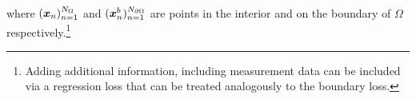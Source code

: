 where $({\bm{x}}_n)_{n=1}^{N_\Omega}$ and  $({\bm{x}}^b_n)_{n=1}^{N_{\partial\Omega}}$ are points in the interior and on the boundary of $\Omega$ respectively.\footnote{Adding additional information, including measurement data can be included via a regression loss that can be treated analogously to the boundary loss.} 



